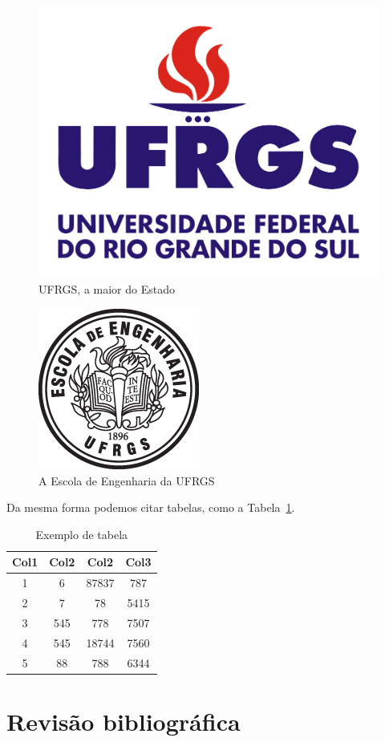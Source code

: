 \documentclass{automatex}
\begin{document}
\begin{figure}
  \centering
  \includegraphics[width=.4\textwidth]{imagens/logo_ufrgs}
  \caption{UFRGS, a maior do Estado}
  \label{fig:ufrgs}
\end{figure}

\begin{figure}
  \centering
  \includegraphics[width=.3\textwidth]{imagens/logo_eng}
  \caption{A Escola de Engenharia da UFRGS}
  \label{fig:ee}
\end{figure}

Da mesma forma podemos citar tabelas, como a Tabela~\ref{tab:exemplo}.

\begin{table}
   \begin{center}
     \begin{tabular}{||c c c c||}
       \hline
       Col1 & Col2 & Col2 & Col3 \\ \hline\hline
       1 & 6 & 87837 & 787 \\ \hline
       2 & 7 & 78 & 5415 \\ \hline
       3 & 545 & 778 & 7507 \\ \hline
       4 & 545 & 18744 & 7560 \\ \hline
       5 & 88 & 788 & 6344 \\ \hline
    \end{tabular}
  \end{center}
  \label{tab:exemplo}
  \caption{Exemplo de tabela}
\end{table}

\section{Revisão bibliográfica}
\end{document}
